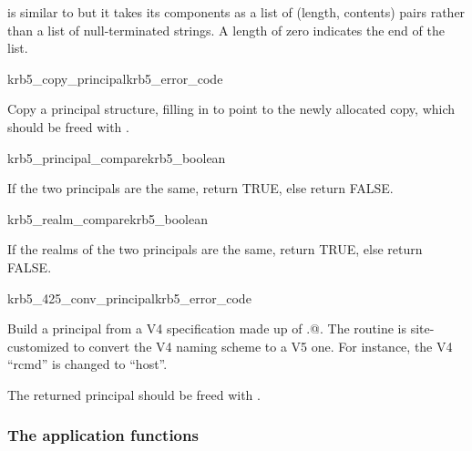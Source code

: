  is similar to
 but it takes its components as a list of
(length, contents) pairs rather than a list of null-terminated strings.
A length of zero indicates the end of the list.

\begin{funcdecl}{krb5_copy_principal}{krb5_error_code}{\funcinout}
\funcin
{}
\funcout
{}
\end{funcdecl}

Copy a principal structure, filling in  to point to
the newly allocated copy, which should be freed with
.

\begin{funcdecl}{krb5_principal_compare}{krb5_boolean}{\funcinout}
\funcin
{}
\end{funcdecl}

If the two principals are the same, return TRUE, else return FALSE.

\begin{funcdecl}{krb5_realm_compare}{krb5_boolean}{\funcinout}
\funcin
{}
\end{funcdecl}

If the realms of the two principals are the same, return TRUE, else
return FALSE. 


\begin{funcdecl}{krb5_425_conv_principal}{krb5_error_code}{\funcinout}
\funcin
{}
\funcout
{}
\end{funcdecl}

Build a principal  from a V4 specification made up of 
.@. The routine is
site-customized to convert the V4 naming scheme to a V5 one. For
instance, the V4 ``rcmd'' is changed to ``host''. 

The returned principal should be freed with
. 

\subsubsection{The application functions}


